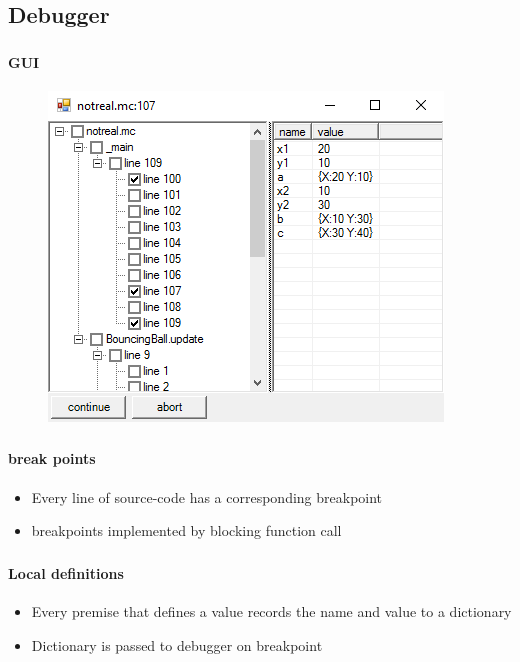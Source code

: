 \subsection{Debugger}

\begin{frame}
    \frametitle{\subsecname}
    \framesubtitle{GUI}
    \begin{figure}
        \includegraphics[scale=0.5]{debugger}
    \end{figure}
\end{frame}

\begin{frame}
    \frametitle{\subsecname}
    \framesubtitle{break points}
    \begin{itemize}
        \item Every line of source-code has a corresponding breakpoint
        \item breakpoints implemented by blocking function call
    \end{itemize}
\end{frame}

\begin{frame}
    \frametitle{\subsecname}
    \framesubtitle{Local definitions}
    \begin{itemize}
        \item Every premise that defines a value records the name and value to a dictionary
        \item Dictionary is passed to debugger on breakpoint
    \end{itemize}

\end{frame}

